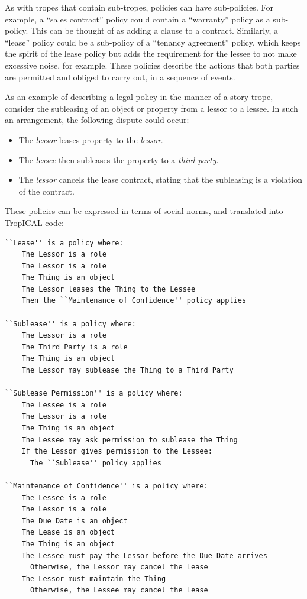 \documentclass[11pt]{report}
\begin{document}
As with tropes that contain sub-tropes, policies can have sub-policies. For
example, a ``sales contract'' policy could contain a ``warranty'' policy as a
sub-policy. This can be thought of as adding a clause to a contract. Similarly,
a ``lease'' policy could be a sub-policy of a ``tenancy agreement'' policy,
which keeps the spirit of the lease policy but adds the requirement for the
lessee to not make excessive noise, for example. These policies describe the
actions that both parties are permitted and obliged to carry out, in a sequence of events.

As an example of describing a legal policy in the manner of a story trope,
consider the subleasing of an object or property from a lessor to a lessee. In
such an arrangement, the following dispute could occur:

\begin{itemize}
  \item The \emph{lessor} leases property to the \emph{lessor}.
  \item The \emph{lessee} then subleases the property to a \emph{third party}.
  \item The \emph{lessor} cancels the lease contract, stating that the
    subleasing is a violation of the contract.
\end{itemize}

These policies can be expressed in terms of social norms, and translated into
TropICAL code:

\begin{lstlisting}[label={list:policies},caption={Example policies in TropICAL}]
``Lease'' is a policy where:
    The Lessor is a role
    The Lessor is a role
    The Thing is an object
    The Lessor leases the Thing to the Lessee
    Then the ``Maintenance of Confidence'' policy applies

``Sublease'' is a policy where:
    The Lessor is a role
    The Third Party is a role
    The Thing is an object
    The Lessor may sublease the Thing to a Third Party 

``Sublease Permission'' is a policy where:
    The Lessee is a role
    The Lessor is a role
    The Thing is an object
    The Lessee may ask permission to sublease the Thing
    If the Lessor gives permission to the Lessee:
      The ``Sublease'' policy applies

``Maintenance of Confidence'' is a policy where:
    The Lessee is a role
    The Lessor is a role
    The Due Date is an object
    The Lease is an object
    The Thing is an object
    The Lessee must pay the Lessor before the Due Date arrives
      Otherwise, the Lessor may cancel the Lease
    The Lessor must maintain the Thing
      Otherwise, the Lessee may cancel the Lease
\end{lstlisting}
\end{document}
